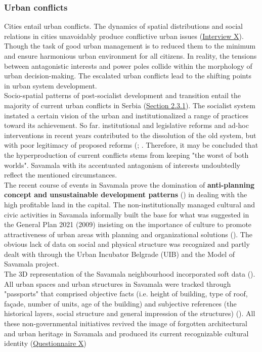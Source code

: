 \documentclass[11pt]{report}
\begin{document}
\subsubsection{Urban conflicts}

Cities entail urban conflicts. The dynamics of spatial distributions and social relations in cities unavoidably produce conflictive urban issues (\href{InterviewX}{Interview X}).
Though the task of good urban management is to reduced them to the minimum and ensure harmonious urban environment for all citizens.
In reality, the tensions between antagonistic interests and power poles collide within the morphology of urban decision-making. The escalated urban conflicts lead to the shifting points in urban system development.
\\

Socio-spatial patterns of post-socialist development and transition entail the majority of current urban conflicts in Serbia (\href{Section 2.3.1}{Section 2.3.1}).
The socialist system instated a certain vision of the urban and institutionalized a range of practices toward its achievement.
So far. institutional and legislative reforms and ad-hoc interventions in recent years contributed to the dissolution of the old system, but with poor legitimacy of proposed reforms (\citealt{world_bank_cities_2000}; \citealt{vujosevic_postsocijalisticka_2010}.
Therefore, it may be concluded that the hyperproduction of current conflicts stems from keeping "the worst of both worlds".
Savamala with its accentuated antagonism of interests undoubtedly reflect the mentioned circumstances.
\\

The recent course of events in Savamala prove the domination of \textbf{anti-planning concept and unsustainable development patterns} (\citealt{vujosevic_postsocijalisticka_2010}) in dealing with the high profitable land in the capital.
The non-institutionally managed cultural and civic activities in Savamala informally built the base for what was suggested in the General Plan 2021 (2009) insisting on the importance of culture to promote attractiveness of urban areas with planning and organizational solutions (\cite{GPXXX}).
The obvious lack of data on social and physical structure was recognized and partly dealt with through the Urban Incubator Belgrade (UIB) and the Model of Savamala project.
\\

The 3D representation of the Savamala neighbourhood incorporated soft data (\citealt{cvetinovic_engine_2013}).
All urban spaces and urban structures in Savamala were tracked through "passports" that comprised objective facts (i.e. height of building, type of roof, façade, number of units, age of the building) and subjective references (the historical layers, social structure and general impression of the structures) (\citealt{lee_yaniya_model_2013}).
All these non-governmental initiatives revived the image of forgotten architectural and urban heritage in Savamala and produced its current recognizable cultural identity
(\href{Questionnaire PhD Savamala}{Questionnaire X})
\\
\end{document}
